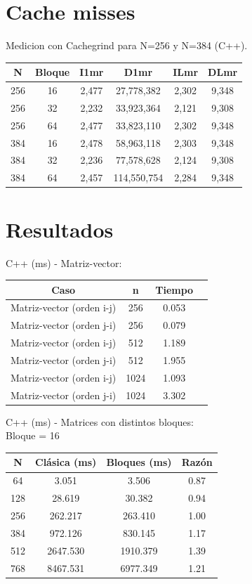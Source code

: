 \documentclass[11pt]{article}
\begin{document}
\section*{Cache misses}
Medicion con Cachegrind para N=256 y N=384 (C++).
\begin{center}
\begin{tabular}{|c|c|c|c|c|c|}
\hline
N & Bloque & I1mr & D1mr & ILmr & DLmr \\
\hline
256 & 16 & 2,477 & 27,778,382 & 2,302 & 9,348 \\
256 & 32 & 2,232 & 33,923,364 & 2,121 & 9,308 \\
256 & 64 & 2,477 & 33,823,110 & 2,302 & 9,348 \\
384 & 16 & 2,478 & 58,963,118 & 2,303 & 9,348 \\
384 & 32 & 2,236 & 77,578,628 & 2,124 & 9,308 \\
384 & 64 & 2,457 & 114,550,754 & 2,284 & 9,348 \\
\hline
\end{tabular}
\end{center}

\section*{Resultados}
C++ (ms) - Matriz-vector:
\begin{center}
\begin{tabular}{|c|c|c|c|}
\hline
Caso & n & Tiempo \\
\hline
Matriz-vector (orden i-j) & 256 & 0.053 \\
Matriz-vector (orden j-i) & 256 & 0.079 \\
Matriz-vector (orden i-j) & 512 & 1.189 \\
Matriz-vector (orden j-i) & 512 & 1.955 \\
Matriz-vector (orden i-j) & 1024 & 1.093 \\
Matriz-vector (orden j-i) & 1024 & 3.302 \\
\hline
\end{tabular}
\end{center}

C++ (ms) - Matrices con distintos bloques: \\
Bloque = 16
\begin{center}
\begin{tabular}{|c|c|c|c|}
\hline
N & Clásica (ms) & Bloques (ms) & Razón \\
\hline
64 & 3.051 & 3.506 & 0.87 \\
128 & 28.619 & 30.382 & 0.94 \\
256 & 262.217 & 263.410 & 1.00 \\
384 & 972.126 & 830.145 & 1.17 \\
512 & 2647.530 & 1910.379 & 1.39 \\
768 & 8467.531 & 6977.349 & 1.21 \\
\hline
\end{tabular}
\end{center}
\end{document}
